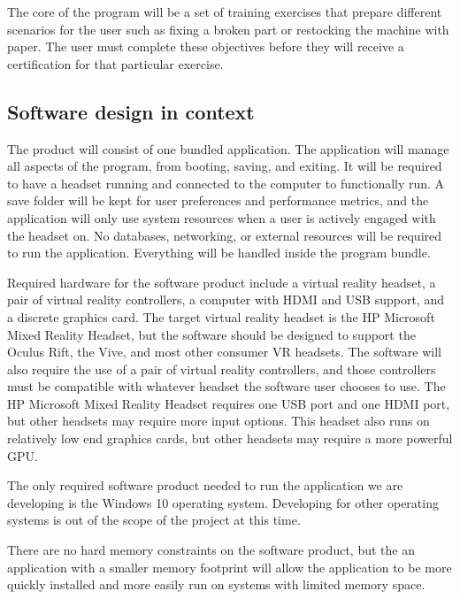 \documentclass[onecolumn, draftclsnofoot,10pt, compsoc]{IEEEtran}
\begin{document}
The core of the program will be a set of training exercises that prepare different scenarios for the user such as fixing a broken part or restocking the machine with paper. The user must complete these objectives before they will receive a certification for that particular exercise.
\subsection{Software design in context}
The product will consist of one bundled application. The application will manage all aspects of the program, from booting, saving, and exiting. It will be required to have a headset running and connected to the computer to functionally run. A save folder will be kept for user preferences and performance metrics, and the application will only use system resources when a user is actively engaged with the headset on. No databases, networking, or external resources will be required to run the application. Everything will be handled inside the program bundle.

Required hardware for the software product include a virtual reality headset, a pair of virtual reality controllers, a computer with HDMI and USB support, and a discrete graphics card. The target virtual reality headset is the HP Microsoft Mixed Reality Headset, but the software should be designed to support the Oculus Rift, the Vive, and most other consumer VR headsets. The software will also require the use of a pair of virtual reality controllers, and those controllers must be compatible with whatever headset the software user chooses to use. The HP Microsoft Mixed Reality Headset requires one USB port and one HDMI port, but other headsets may require more input options. This headset also runs on relatively low end graphics cards, but other headsets may require a more powerful GPU. 

The only required software product needed to run the application we are developing is the Windows 10 operating system. Developing for other operating systems is out of the scope of the project at this time. 

There are no hard memory constraints on the software product, but the an application with a smaller memory footprint will allow the application to be more quickly installed and more easily run on systems with limited memory space. 
\end{document}
